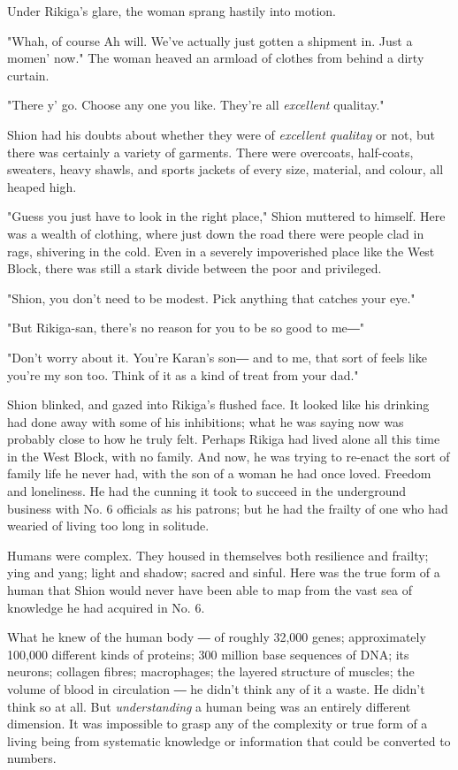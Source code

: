 Under Rikiga's glare, the woman sprang hastily into motion.

"Whah, of course Ah will. We've actually just gotten a shipment in. Just
a momen' now." The woman heaved an armload of clothes from behind a
dirty curtain.

"There y' go. Choose any one you like. They're all \emph{excellent} qualitay."

Shion had his doubts about whether they were of \emph{excellent qualitay} or
not, but there was certainly a variety of garments. There were
overcoats, half-coats, sweaters, heavy shawls, and sports jackets of
every size, material, and colour, all heaped high.

"Guess you just have to look in the right place," Shion muttered to
himself. Here was a wealth of clothing, where just down the road there
were people clad in rags, shivering in the cold. Even in a severely
impoverished place like the West Block, there was still a stark divide
between the poor and privileged.

"Shion, you don't need to be modest. Pick anything that catches your
eye."

"But Rikiga-san, there's no reason for you to be so good to me―"

"Don't worry about it. You're Karan's son― and to me, that sort of feels
like you're my son too. Think of it as a kind of treat from your dad."

Shion blinked, and gazed into Rikiga's flushed face. It looked like his
drinking had done away with some of his inhibitions; what he was saying
now was probably close to how he truly felt. Perhaps Rikiga had lived
alone all this time in the West Block, with no family. And now, he was
trying to re-enact the sort of family life he never had, with the son of
a woman he had once loved. Freedom and loneliness. He had the cunning it
took to succeed in the underground business with No. 6 officials as his
patrons; but he had the frailty of one who had wearied of living too
long in solitude.

Humans were complex. They housed in themselves both resilience and
frailty; ying and yang; light and shadow; sacred and sinful. Here was
the true form of a human that Shion would never have been able to map
from the vast sea of knowledge he had acquired in No. 6.

What he knew of the human body ― of roughly 32,000 genes; approximately
100,000 different kinds of proteins; 300 million base sequences of DNA;
its neurons; collagen fibres; macrophages; the layered structure of
muscles; the volume of blood in circulation ― he didn't think any of it
a waste. He didn't think so at all. But \emph{understanding} a human being was
an entirely different dimension. It was impossible to grasp any of the
complexity or true form of a living being from systematic knowledge or
information that could be converted to numbers.

